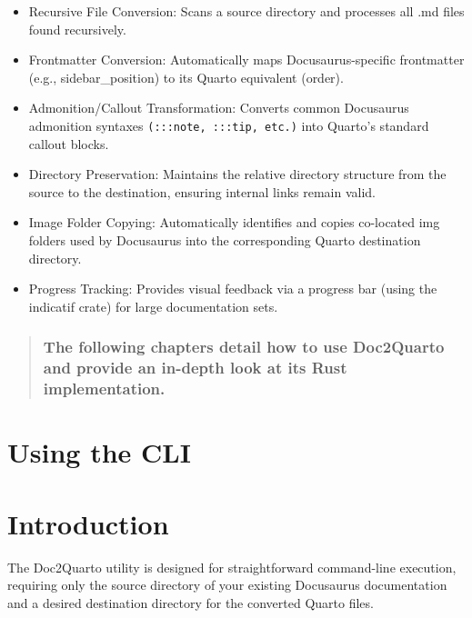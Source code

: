 \documentclass[
  letterpaper,
  DIV=11,
  numbers=noendperiod]{scrreprt}
\begin{document}
\begin{itemize}
\item[$\square$]
  Recursive File Conversion: Scans a source directory and processes all
  .md files found recursively.
\item[$\square$]
  Frontmatter Conversion: Automatically maps Docusaurus-specific
  frontmatter (e.g., sidebar\_position) to its Quarto equivalent
  (order).
\item[$\square$]
  Admonition/Callout Transformation: Converts common Docusaurus
  admonition syntaxes \texttt{(:::note,\ :::tip,\ etc.)} into Quarto's
  standard callout blocks.
\item[$\square$]
  Directory Preservation: Maintains the relative directory structure
  from the source to the destination, ensuring internal links remain
  valid.
\item[$\square$]
  Image Folder Copying: Automatically identifies and copies co-located
  img folders used by Docusaurus into the corresponding Quarto
  destination directory.
\item[$\square$]
  Progress Tracking: Provides visual feedback via a progress bar (using
  the indicatif crate) for large documentation sets.
\end{itemize}

\begin{quote}
\subsection{The following chapters detail how to use Doc2Quarto and
provide an in-depth look at its Rust
implementation.}\label{the-following-chapters-detail-how-to-use-doc2quarto-and-provide-an-in-depth-look-at-its-rust-implementation.}
\end{quote}

\chapter{Using the CLI}\label{using-the-cli}

\chapter{Introduction}\label{introduction-1}

The Doc2Quarto utility is designed for straightforward command-line
execution, requiring only the source directory of your existing
Docusaurus documentation and a desired destination directory for the
converted Quarto files.
\end{document}
